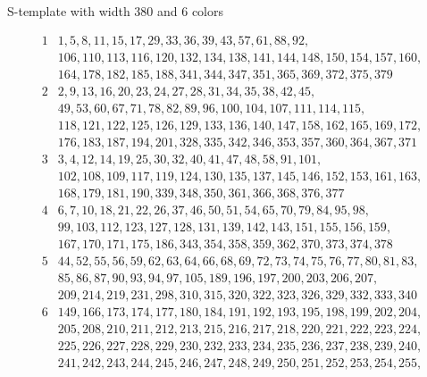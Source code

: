 \documentclass{article}
\newtheorem{computational theorem}[definition]{Computational Theorem}
\begin{document}
\begin{table}[H]
{\footnotesize
	\caption{S-template with width 380 and 6 colors}}
\begin{center}
\begin{small}
\[
\begin{array}{|*{2}{c|}}
	\hline
	1 & 1, 5, 8, 11, 15, 17, 29, 33, 36, 39, 43, 57, 61, 88, 92, \\
	& 106, 110, 113, 116, 120, 132, 134, 138, 141, 144, 148, 150, 154, 157, 160, \\
	& 164, 178, 182, 185, 188, 341, 344, 347, 351, 365, 369, 372, 375, 379\\
	\hline
	2 & 2, 9, 13, 16, 20, 23, 24, 27, 28, 31, 34, 35, 38, 42, 45,\\
	& 49, 53, 60, 67, 71, 78, 82, 89, 96, 100, 104, 107, 111, 114, 115,\\
	& 118, 121, 122, 125, 126, 129, 133, 136, 140, 147, 158, 162, 165, 169, 172,\\
	& 176, 183, 187, 194, 201, 328, 335, 342, 346, 353, 357, 360, 364, 367, 371\\
	\hline
	3 & 3, 4, 12, 14, 19, 25, 30, 32, 40, 41, 47, 48, 58, 91, 101,\\
	& 102, 108, 109, 117, 119, 124, 130, 135, 137, 145, 146, 152, 153, 161, 163,\\
	& 168, 179, 181, 190, 339, 348, 350, 361, 366, 368, 376, 377\\
	\hline
	4 & 6, 7, 10, 18, 21, 22, 26, 37, 46, 50, 51, 54, 65, 70, 79, 84, 95, 98,\\
	& 99, 103, 112, 123, 127, 128, 131, 139, 142, 143, 151, 155, 156, 159,\\
	& 167, 170, 171, 175, 186, 343, 354, 358, 359, 362, 370, 373, 374, 378\\
	\hline
	5 & 44, 52, 55, 56, 59, 62, 63, 64, 66, 68, 69, 72, 73, 74, 75, 76, 77, 80, 81, 83,\\
	&  85, 86, 87, 90, 93, 94, 97, 105, 189, 196, 197, 200, 203, 206, 207, \\
	& 209, 214, 219, 231, 298, 310, 315, 320, 322, 323,  326, 329, 332, 333, 340\\
	\hline
	6 & 149, 166, 173, 174, 177, 180, 184, 191, 192, 193, 195, 198, 199, 202, 204,\\
	& 205, 208, 210, 211, 212, 213, 215, 216, 217, 218, 220, 221, 222, 223, 224,\\
	& 225, 226, 227, 228, 229, 230, 232, 233, 234, 235, 236, 237, 238, 239, 240,\\
	& 241, 242, 243, 244, 245, 246, 247, 248, 249, 250, 251, 252, 253, 254, 255,\\

\end{array}\]
\end{small}
\end{center}
\end{table}
\end{document}
